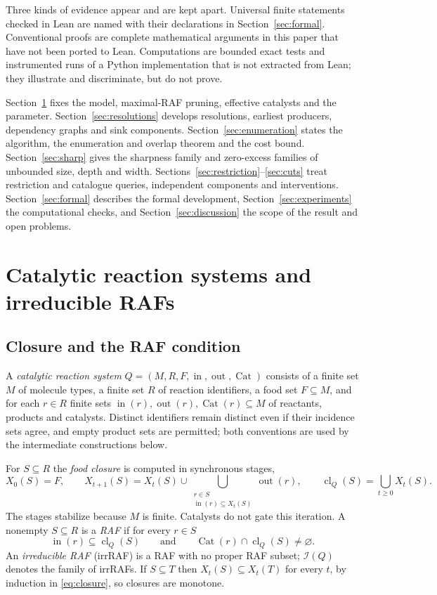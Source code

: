 \documentclass[11pt,a4paper]{article}
\theoremstyle{plain}
\theoremstyle{definition}
\theoremstyle{remark}
\newcommand{\Irr}{\mathcal I}
\newcommand{\cl}{\operatorname{cl}}
\newcommand{\Cat}{\operatorname{Cat}}
\newcommand{\inp}{\operatorname{in}}
\newcommand{\out}{\operatorname{out}}
\begin{document}
Three kinds of evidence appear and are kept apart. Universal finite statements checked in Lean are named with their declarations in Section~\ref{sec:formal}. Conventional proofs are complete mathematical arguments in this paper that have not been ported to Lean. Computations are bounded exact tests and instrumented runs of a Python implementation that is not extracted from Lean; they illustrate and discriminate, but do not prove.

Section~\ref{sec:defs} fixes the model, maximal-RAF pruning, effective catalysts and the parameter. Section~\ref{sec:resolutions} develops resolutions, earliest producers, dependency graphs and sink components. Section~\ref{sec:enumeration} states the algorithm, the enumeration and overlap theorem and the cost bound. Section~\ref{sec:sharp} gives the sharpness family and zero-excess families of unbounded size, depth and width. Sections~\ref{sec:restriction}--\ref{sec:cuts} treat restriction and catalogue queries, independent components and interventions. Section~\ref{sec:formal} describes the formal development, Section~\ref{sec:experiments} the computational checks, and Section~\ref{sec:discussion} the scope of the result and open problems.

\section{Catalytic reaction systems and irreducible RAFs}\label{sec:defs}

\subsection{Closure and the RAF condition}

A \emph{catalytic reaction system} $Q=(M,R,F,\inp,\out,\Cat)$ consists of a finite set $M$ of molecule types, a finite set $R$ of reaction identifiers, a food set $F\subseteq M$, and for each $r\in R$ finite sets $\inp(r),\out(r),\Cat(r)\subseteq M$ of reactants, products and catalysts. Distinct identifiers remain distinct even if their incidence sets agree, and empty product sets are permitted; both conventions are used by the intermediate constructions below.

For $S\subseteq R$ the \emph{food closure} is computed in synchronous stages,
\begin{equation}\label{eq:closure}
 X_0(S)=F,\qquad
 X_{t+1}(S)=X_t(S)\cup\bigcup_{\substack{r\in S\\ \inp(r)\subseteq X_t(S)}}\out(r),
 \qquad \cl_Q(S)=\bigcup_{t\ge0}X_t(S).
\end{equation}
The stages stabilize because $M$ is finite. Catalysts do not gate this iteration. A nonempty $S\subseteq R$ is a \emph{RAF} if for every $r\in S$
\begin{equation}\label{eq:raf}
 \inp(r)\subseteq\cl_Q(S)\qquad\text{and}\qquad\Cat(r)\cap\cl_Q(S)\neq\varnothing.
\end{equation}
An \emph{irreducible RAF} (irrRAF) is a RAF with no proper RAF subset; $\Irr(Q)$ denotes the family of irrRAFs. If $S\subseteq T$ then $X_t(S)\subseteq X_t(T)$ for every $t$, by induction in \eqref{eq:closure}, so closures are monotone.
\end{document}
